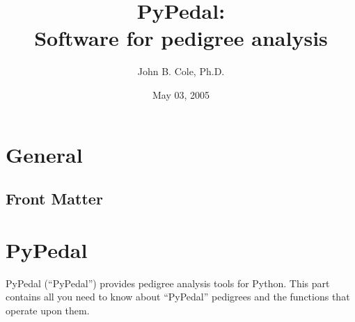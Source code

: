 \documentclass[hyperref]{manual}
\title{PyPedal:\\Software for pedigree analysis}
\author{John B. Cole, Ph.D.}
\date{May 03, 2005}          %
\newcommand{\pypedal}{PyPedal}
\newcommand{\PYPEDAL}{PyPedal}
\begin{document}
\maketitle

\ifhtml
\part*{General}
\chapter*{Front Matter}
\label{front}
\fi



\tableofcontents

\part{Py{P}edal}
\PYPEDAL{} (``\pypedal{}'') provides pedigree analysis tools for
Python.  This part contains all you need to know about ``\pypedal{}''
pedigrees and the functions that operate upon them.

\label{part:pypedal}









%
\end{document}
